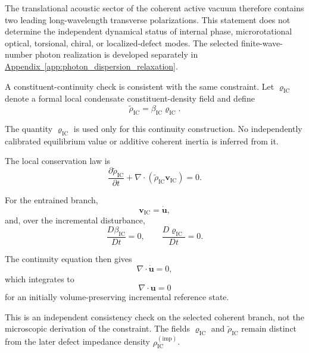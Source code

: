 The translational acoustic sector of the coherent active vacuum therefore contains two leading long-wavelength transverse polarizations. This statement does not determine the independent dynamical status of internal phase, microrotational optical, torsional, chiral, or localized-defect modes. The selected finite-wave-number photon realization is developed separately in \hyperref[app:photon_dispersion_relaxation]{Appendix~\ref*{app:photon_dispersion_relaxation}}.

A constituent-continuity check is consistent with the same constraint. Let $\varrho_{\mathrm{IC}}$ denote a formal local condensate constituent-density field and define
\begin{equation}
    \widetilde{\rho}_{\mathrm{IC}}
    =
    \beta_{\mathrm{IC}}
    \varrho_{\mathrm{IC}}.
\end{equation}

The quantity $\varrho_{\mathrm{IC}}$ is used only for this continuity construction. No independently calibrated equilibrium value or additive coherent inertia is inferred from it.

The local conservation law is
\begin{equation}
    \frac{\partial\widetilde{\rho}_{\mathrm{IC}}}{\partial t}
    +
    \nabla\cdot
    \left(
        \widetilde{\rho}_{\mathrm{IC}}
        \mathbf{v}_{\mathrm{IC}}
    \right)
    =
    0.
\end{equation}

For the entrained branch,
\begin{equation}
    \mathbf{v}_{\mathrm{IC}}
    =
    \dot{\mathbf{u}},
\end{equation}
and, over the incremental disturbance,
\begin{equation}
    \frac{D\beta_{\mathrm{IC}}}{Dt}
    =
    0,
    \qquad
    \frac{D\varrho_{\mathrm{IC}}}{Dt}
    =
    0.
\end{equation}

The continuity equation then gives
\begin{equation}
    \nabla\cdot\dot{\mathbf{u}}
    =
    0,
\end{equation}
which integrates to
\begin{equation}
    \nabla\cdot\mathbf{u}
    =
    0
\end{equation}
for an initially volume-preserving incremental reference state.

This is an independent consistency check on the selected coherent branch, not the microscopic derivation of the constraint. The fields $\varrho_{\mathrm{IC}}$ and $\widetilde{\rho}_{\mathrm{IC}}$ remain distinct from the later defect impedance density $\rho_{\mathrm{IC}}^{(\mathrm{imp})}$.


